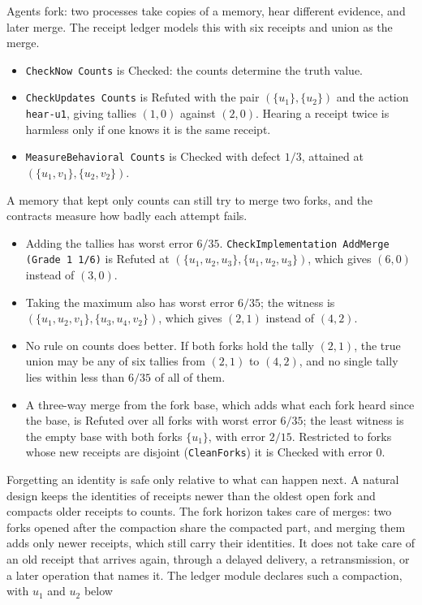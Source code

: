 \documentclass[11pt]{article}
\newcommand{\code}[1]{\texttt{#1}}
\theoremstyle{definition}
\theoremstyle{plain}
\begin{document}
Agents fork: two processes take copies of a memory, hear different evidence, and later merge. The
receipt ledger models this with six receipts and union as the merge.
\begin{itemize}
\item \code{CheckNow Counts} is Checked: the counts determine the truth value.
\item \code{CheckUpdates Counts} is Refuted with the pair $(\{u_1\},\{u_2\})$ and the action
\code{hear-u1}, giving tallies $(1,0)$ against $(2,0)$. Hearing a receipt twice is harmless only if
one knows it is the same receipt.
\item \code{MeasureBehavioral Counts} is Checked with defect $1/3$, attained at
$(\{u_1,v_1\},\{u_2,v_2\})$.
\end{itemize}
A memory that kept only counts can still try to merge two forks, and the contracts measure how
badly each attempt fails.
\begin{itemize}
\item Adding the tallies has worst error $6/35$. \code{CheckImplementation AddMerge (Grade 1 1/6)}
is Refuted at $(\{u_1,u_2,u_3\},\{u_1,u_2,u_3\})$, which gives $(6,0)$ instead of $(3,0)$.
\item Taking the maximum also has worst error $6/35$; the witness is
$(\{u_1,u_2,v_1\},\{u_3,u_4,v_2\})$, which gives $(2,1)$ instead of $(4,2)$.
\item No rule on counts does better. If both forks hold the tally $(2,1)$, the true union may be
any of six tallies from $(2,1)$ to $(4,2)$, and no single tally lies within less than $6/35$ of all of
them.
\item A three-way merge from the fork base, which adds what each fork heard since the base, is
Refuted over all forks with worst error $6/35$; the least witness is the empty base with both forks
$\{u_1\}$, with error $2/15$. Restricted to forks whose new receipts are disjoint
(\code{CleanForks}) it is Checked with error $0$.
\end{itemize}
Forgetting an identity is safe only relative to what can happen next. A natural design keeps the
identities of receipts newer than the oldest open fork and compacts older receipts to counts. The
fork horizon takes care of merges: two forks opened after the compaction share the compacted part,
and merging them adds only newer receipts, which still carry their identities. It does not take care
of an old receipt that arrives again, through a delayed delivery, a retransmission, or a later
operation that names it. The ledger module declares such a compaction, with $u_1$ and $u_2$ below
\end{document}
